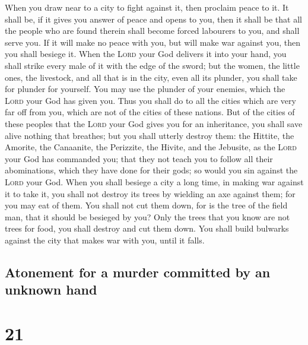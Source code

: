  When you draw near to a city to fight against it, then
proclaim peace to it.  It shall be, if it gives you
answer of peace and opens to you, then it shall be that all the people
who are found therein shall become forced labourers to you, and shall
serve you.  If it will make no peace with you, but will
make war against you, then you shall besiege it.  When
the \textsc{Lord} your God delivers it into your hand, you shall strike
every male of it with the edge of the sword;  but the
women, the little ones, the livestock, and all that is in the city, even
all its plunder, you shall take for plunder for yourself. You may use
the plunder of your enemies, which the \textsc{Lord} your God has given
you.  Thus you shall do to all the cities which are very
far off from you, which are not of the cities of these nations.
 But of the cities of these peoples that the
\textsc{Lord} your God gives you for an inheritance, you shall save
alive nothing that breathes;  but you shall utterly
destroy them: the Hittite, the Amorite, the Canaanite, the Perizzite,
the Hivite, and the Jebusite, as the \textsc{Lord} your God has
commanded you;  that they not teach you to follow all
their abominations, which they have done for their gods; so would you
sin against the \textsc{Lord} your God.  When you shall
besiege a city a long time, in making war against it to take it, you
shall not destroy its trees by wielding an axe against them; for you may
eat of them. You shall not cut them down, for is the tree of the field
man, that it should be besieged by you?  Only the trees
that you know are not trees for food, you shall destroy and cut them
down. You shall build bulwarks against the city that makes war with you,
until it falls.

\hypertarget{atonement-for-a-murder-committed-by-an-unknown-hand}{%
\subsection{Atonement for a murder committed by an unknown
hand}\label{atonement-for-a-murder-committed-by-an-unknown-hand}}

\hypertarget{section-20}{%
\section{21}\label{section-20}}

